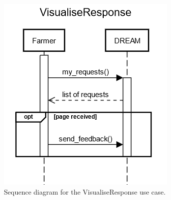 \documentclass{article}
\begin{document}
\begin{figure}[H]
    \centering
    \includegraphics[scale=0.75]{sequence_diagrams/VisualiseResponse.png}
    \caption{Sequence diagram for the VisualiseResponse use case.}
\end{figure}
\newpage

\end{document}
